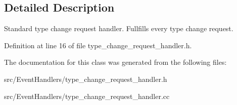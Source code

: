 \subsection{Detailed Description}
Standard type change request handler. Fullfills every type change request. 

Definition at line 16 of file type\_\-change\_\-request\_\-handler.h.

The documentation for this class was generated from the following files:\begin{CompactItemize}
\item 
src/EventHandlers/type\_\-change\_\-request\_\-handler.h\item 
src/EventHandlers/type\_\-change\_\-request\_\-handler.cc\end{CompactItemize}
